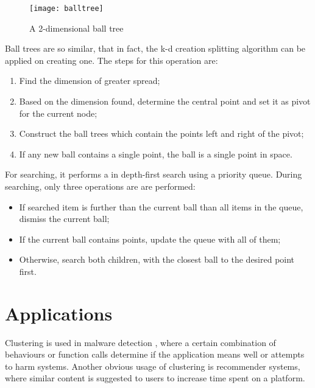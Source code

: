 \begin{figure}[b!]
\centering
\texttt{[image: balltree]}
\caption{A 2-dimensional ball tree}
\label{fig:balltree}
\end{figure}

Ball trees are so similar, that in fact, the k-d creation splitting algorithm can be applied on creating one. The steps for this operation are:

\begin{enumerate}
\item{Find the dimension of greater spread;}
\item{Based on the dimension found, determine the central point and set it as pivot for the current node;}
\item{Construct the ball trees which contain the points left and right of the pivot;}
\item{If any new ball contains a single point, the ball is a single point in space.}
\end{enumerate}

For searching, it performs a in depth-first search using a priority queue. During searching, only three operations are are performed:

\begin{itemize}
\item{If searched item is further than the current ball than all items in the queue, dismiss the current ball;}
\item{If the current ball contains points, update the queue with all of them;}
\item{Otherwise, search both children, with the closest ball to the desired point first.}
\end{itemize}

\section{Applications}
\label{sec:cluster_applications}

Clustering is used in malware detection \cite{malware}, where a certain combination of behaviours or function calls determine if the application means well or attempts to harm systems. Another obvious usage of clustering is recommender systems, where similar content is suggested to users to increase time spent on a platform.
